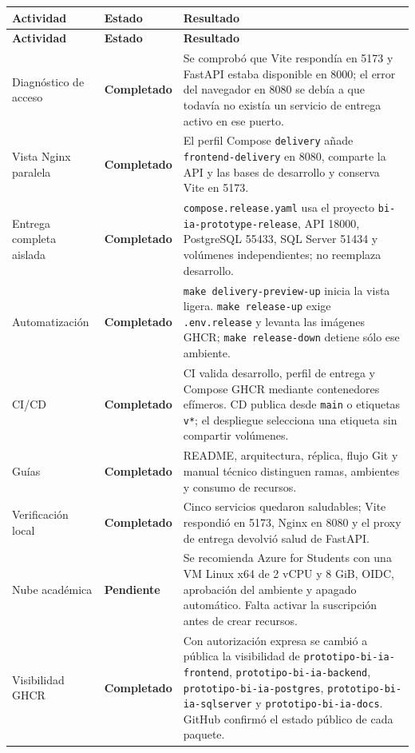 \documentclass[11pt,letterpaper]{article}
\newcommand{\statusok}{\textcolor{deepgreen}{\textbf{Completado}}}
\newcommand{\statuspending}{\textcolor{warning}{\textbf{Pendiente}}}
\newcommand{\file}[1]{\texttt{#1}}
\begin{document}
\begin{longtable}{@{}p{}p{}p{}@{}}
  \toprule
  \textbf{Actividad} & \textbf{Estado} & \textbf{Resultado} \\
  \midrule
  \endfirsthead
  \toprule
  \textbf{Actividad} & \textbf{Estado} & \textbf{Resultado} \\
  \midrule
  \endhead
  Diagnóstico de acceso & \statusok & Se comprobó que Vite respondía en 5173 y FastAPI estaba disponible en 8000; el error del navegador en 8080 se debía a que todavía no existía un servicio de entrega activo en ese puerto. \\
  Vista Nginx paralela & \statusok & El perfil Compose \file{delivery} añade \file{frontend-delivery} en 8080, comparte la API y las bases de desarrollo y conserva Vite en 5173. \\
  Entrega completa aislada & \statusok & \file{compose.release.yaml} usa el proyecto \file{bi-ia-prototype-release}, API 18000, PostgreSQL 55433, SQL Server 51434 y volúmenes independientes; no reemplaza desarrollo. \\
  Automatización & \statusok & \file{make delivery-preview-up} inicia la vista ligera. \file{make release-up} exige \file{.env.release} y levanta las imágenes GHCR; \file{make release-down} detiene sólo ese ambiente. \\
  CI/CD & \statusok & CI valida desarrollo, perfil de entrega y Compose GHCR mediante contenedores efímeros. CD publica desde \file{main} o etiquetas \file{v*}; el despliegue selecciona una etiqueta sin compartir volúmenes. \\
  Guías & \statusok & README, arquitectura, réplica, flujo Git y manual técnico distinguen ramas, ambientes y consumo de recursos. \\
  Verificación local & \statusok & Cinco servicios quedaron saludables; Vite respondió en 5173, Nginx en 8080 y el proxy de entrega devolvió salud de FastAPI. \\
  Nube académica & \statuspending & Se recomienda Azure for Students con una VM Linux x64 de 2 vCPU y 8 GiB, OIDC, aprobación del ambiente y apagado automático. Falta activar la suscripción antes de crear recursos. \\
  Visibilidad GHCR & \statusok & Con autorización expresa se cambió a pública la visibilidad de \file{prototipo-bi-ia-frontend}, \file{prototipo-bi-ia-backend}, \file{prototipo-bi-ia-postgres}, \file{prototipo-bi-ia-sqlserver} y \file{prototipo-bi-ia-docs}. GitHub confirmó el estado público de cada paquete. \\
  \bottomrule
\end{longtable}
\end{document}
